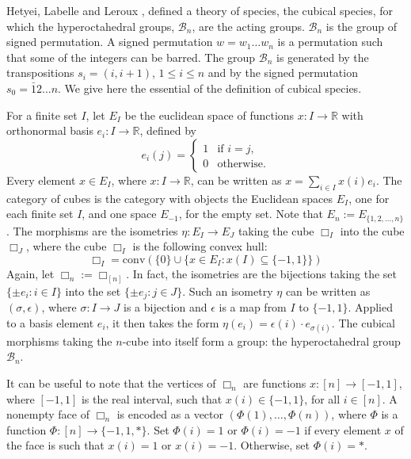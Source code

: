\documentclass[11pt,reqno]{amsart}
\numberwithin{equation}{section}
\def\R{{\mathbb R}}
\def\Bn{\mathcal{B}_n}
\begin{document}
Hetyei, Labelle and Leroux \cite{HLL}, defined a theory of species, the cubical species, for which the hyperoctahedral groups, $\Bn$, are the acting groups. $\Bn$ is the group of signed permutation. A signed permutation $w=w_1\dots w_n$ is a permutation such that some of the integers can be barred. The group $\Bn$ is generated by the transpositions $s_i=(i,i+1)$, $1\leq i \leq n$ and by the signed permutation $s_0=\bar{1}2\dots n$. We give here the essential of the definition of cubical species.


For a finite set $I$, let $E_I$ be the euclidean space of functions $x\colon I\rightarrow \R$ with orthonormal basis $e_i\colon I\rightarrow \R$, defined by
\begin{equation*}
e_i(j)=\begin{cases} 1 &\text{if $i=j$,}\\ 0 & \text{otherwise.} \end{cases}
\end{equation*}
Every element $x\in E_I$, where $x\colon I\rightarrow \R$, can be written as $x=\sum_{i\in I} x(i)e_i$. The category of cubes is the category with objects the Euclidean spaces $E_I$, one for each finite set $I$, and one space $E_{-1}$, for the empty set. Note that $E_n:=E_{\{1,2,\dots,n\}}$. The morphisms are the isometries $\eta\colon E_I\rightarrow E_J$ taking the cube $\Box_I$ into the cube $\Box_J$, where the cube $\Box_I$ is the following convex hull:
$$\Box_I=\mathrm{conv}(\{0\}\cup \{x\in E_I : x(I) \subseteq \{-1,1\}\})$$
Again, let $\Box_n:=\Box_{[n]}$. In fact, the isometries are the bijections taking the set $\{\pm e_i:i\in I\}$ into the set $\{\pm e_j:j\in J\}$. Such an isometry $\eta$ can be written as $(\sigma,\epsilon)$, where $\sigma\colon I\rightarrow J$ is a bijection and $\epsilon$ is a map from $I$ to $\{-1,1\}$. Applied to a basis element $e_i$, it then takes the form $\eta(e_i)=\epsilon(i)\cdot e_{\sigma(i)}$. The cubical morphisms taking the $n$-cube into itself form a group: the hyperoctahedral group $\Bn$.

It can be useful to note that the vertices of $\Box_n$ are functions $x\colon [n]\rightarrow [-1,1]$, where $[-1,1]$ is the real interval, such that $x(i)\in\{-1,1\}$, for all $i\in [n]$. A nonempty face of $\Box_n$ is encoded as a vector $(\Phi(1),\dots,\Phi(n))$, where $\Phi$ is a function $\Phi\colon [n]\rightarrow \{-1,1,\ast\}$. Set $\Phi(i)=1$ or $\Phi(i)=-1$ if every element $x$ of the face is such that $x(i)=1$ or $x(i)=-1$. Otherwise, set $\Phi(i)=\ast$.
\end{document}
